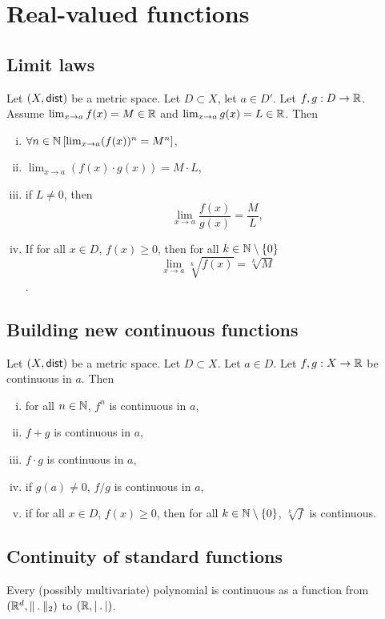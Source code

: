 \section{Real-valued functions}

\subsection{Limit laws}
\uthm Let $(X, \mathsf{dist})$ be a metric space. Let $D \subset X$, let $a \in D'$.
Let $f,g : D \to \mathbb{R}$.\\Assume $\lim_{x \to a} f(x) = M \in \mathbb{R}$ and 
$\lim_{x \to a} g(x) = L \in \mathbb{R}$. Then
\begin{enumerate}[(i)]
    \item $\forall n \in \mathbb{N} \left[ \lim_{x \to a} (f(x))^n = M^n \right]$,
    \item $\lim_{x \to a} (f(x) \cdot g(x)) = M \cdot L$,
    \item if $L \neq 0$, then \[
        \lim_{x \to a} \frac{f(x)}{g(x)} = \frac{M}{L}, \]
    \item If for all $x \in D$, $f(x) \geq 0$, then for all $k \in \mathbb{N} \setminus \{0\}$
        \[ \lim_{x \to a} \sqrt[k]{f(x)} = \sqrt[k]{M} \].
\end{enumerate}

\subsection{Building new continuous functions}
Let $(X, \mathsf{dist})$ be a metric space. Let $D \subset X$. Let $a \in D$.
Let $f,g : X \to \mathbb{R}$ be continuous in $a$. Then
\begin{enumerate}[(i)]
    \item for all $n \in \mathbb{N}$, $f^n$ is continuous in $a$,
    \item $f + g$ is continuous in $a$,
    \item $f \cdot g$ is continuous in $a$,
    \item if $g(a) \neq 0$, $f/g$ is continuous in $a$,
    \item if for all $x \in D$, $f(x) \geq 0$, then for all $k \in \mathbb{N} \setminus \{0\}$,
        $\sqrt[k]{f}$ is continuous.
\end{enumerate}

\subsection{Continuity of standard functions}
\uprop Every (possibly multivariate) polynomial is continuous as a function from
$(\R^d, \norm_2)$ to $(\R, \normR)$.


